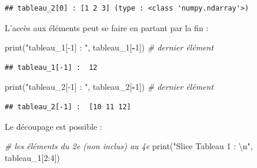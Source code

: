 \documentclass[12pt,]{book}
\newenvironment{Shaded}{\begin{snugshade}}{\end{snugshade}}
\newcommand{\DecValTok}[1]{\textcolor[rgb]{0.00,0.00,0.81}{#1}}
\newcommand{\CharTok}[1]{\textcolor[rgb]{0.31,0.60,0.02}{#1}}
\newcommand{\SpecialCharTok}[1]{\textcolor[rgb]{0.00,0.00,0.00}{#1}}
\newcommand{\StringTok}[1]{\textcolor[rgb]{0.31,0.60,0.02}{#1}}
\newcommand{\CommentTok}[1]{\textcolor[rgb]{0.56,0.35,0.01}{\textit{#1}}}
\newcommand{\OperatorTok}[1]{\textcolor[rgb]{0.81,0.36,0.00}{\textbf{#1}}}
\newcommand{\BuiltInTok}[1]{#1}
\newcommand{\NormalTok}[1]{#1}
\numberwithin{equation}{section}
\numberwithin{countremarque}{section}
\begin{document}
\begin{Shaded}
\end{Shaded}

\begin{lstlisting}
## tableau_2[0] : [1 2 3] (type : <class 'numpy.ndarray'>)
\end{lstlisting}

L'accès aux éléments peut se faire en partant par la fin :

\begin{Shaded}
\begin{Highlighting}[]
\BuiltInTok{print}\NormalTok{(}\StringTok{"tableau_1[-1] : "}\NormalTok{, tableau_1[}\OperatorTok{-}\DecValTok{1}\NormalTok{]) }\CommentTok{# dernier élément}
\end{Highlighting}
\end{Shaded}

\begin{lstlisting}
## tableau_1[-1] :  12
\end{lstlisting}

\begin{Shaded}
\begin{Highlighting}[]
\BuiltInTok{print}\NormalTok{(}\StringTok{"tableau_2[-1] : "}\NormalTok{, tableau_2[}\OperatorTok{-}\DecValTok{1}\NormalTok{]) }\CommentTok{# dernier élément}
\end{Highlighting}
\end{Shaded}

\begin{lstlisting}
## tableau_2[-1] :  [10 11 12]
\end{lstlisting}

Le découpage est possible :

\begin{Shaded}
\begin{Highlighting}[]
\CommentTok{# les éléments du 2e (non inclus) au 4e}
\BuiltInTok{print}\NormalTok{(}\StringTok{"Slice Tableau 1 : }\CharTok{\textbackslash{}n}\StringTok{"}\NormalTok{, tableau_1[}\DecValTok{2}\NormalTok{:}\DecValTok{4}\NormalTok{])}
\end{Highlighting}
\end{Shaded}
\end{document}
